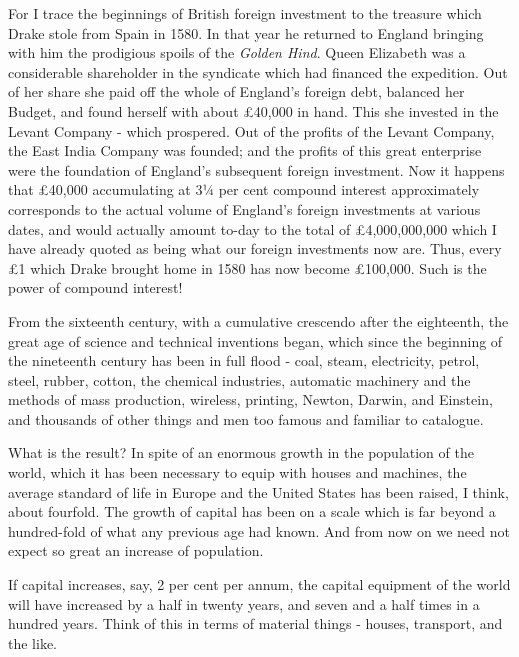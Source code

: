 For I trace the beginnings of British foreign investment to the treasure which Drake stole from Spain in 1580. In that year he returned to England bringing with him the prodigious spoils of the \textit{Golden Hind}. Queen Elizabeth was a considerable shareholder in the syndicate which had financed the expedition. Out of her share she paid off the whole of England’s foreign debt, balanced her Budget, and found herself with about £40,000 in hand. This she invested in the Levant Company - which prospered. Out of the profits of the Levant Company, the East India Company was founded; and the profits of this great enterprise were the foundation of England’s subsequent foreign investment. Now it happens that £40,000 accumulating at 3¼ per cent compound interest approximately corresponds to the actual volume of England’s foreign investments at various dates, and would actually amount to-day to the total of £4,000,000,000 which I have already quoted as being what our foreign investments now are. Thus, every £1 which Drake brought home in 1580 has now become £100,000. Such is the power of compound interest!\par

From the sixteenth century, with a cumulative crescendo after the eighteenth, the great age of science and technical inventions began, which since the beginning of the nineteenth century has been in full flood - coal, steam, electricity, petrol, steel, rubber, cotton, the chemical industries, automatic machinery and the methods of mass production, wireless, printing, Newton, Darwin, and Einstein, and thousands of other things and men too famous and familiar to catalogue.\par

What is the result? In spite of an enormous growth in the population of the world, which it has been necessary to equip with houses and machines, the average standard of life in Europe and the United States has been raised, I think, about fourfold. The growth of capital has been on a scale which is far beyond a hundred-fold of what any previous age had known. And from now on we need not expect so great an increase of population.\par

If capital increases, say, 2 per cent per annum, the capital equipment of the world will have increased by a half in twenty years, and seven and a half times in a hundred years. Think of this in terms of material things - houses, transport, and the like.\par

